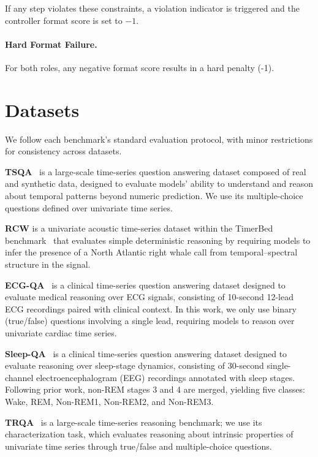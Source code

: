 If any step violates these constraints, a violation indicator
is triggered and the controller format score
is set to \(-1\).

\paragraph{Hard Format Failure.}
For both roles, any negative format score results in a hard penalty (-1).

\section{Datasets}
\label{app:datasets}



We follow each benchmark’s standard evaluation protocol, with minor restrictions for consistency across datasets.

\textbf{TSQA}~\cite{tsqa_dataset} is a large-scale time-series question answering dataset composed of real and synthetic data, designed to evaluate models’ ability to understand and reason about temporal patterns beyond numeric prediction. We use its multiple-choice questions defined over univariate time series.

\textbf{RCW} is a univariate acoustic time-series dataset within the TimerBed benchmark~\cite{rcw_dataset} that evaluates simple deterministic reasoning by requiring models to infer the presence of a North Atlantic right whale call from temporal–spectral structure in the signal.

\textbf{ECG-QA}~\cite{ecgqa_dataset} is a clinical time-series question answering dataset designed to evaluate medical reasoning over ECG signals, consisting of 10-second 12-lead ECG recordings paired with clinical context. In this work, we only use binary (true/false) questions involving a single lead, requiring models to reason over univariate cardiac time series.

\textbf{Sleep-QA}~\cite{langer2025opentslm} is a clinical time-series question answering dataset designed to evaluate reasoning over sleep-stage dynamics, consisting of 30-second single-channel electroencephalogram (EEG) recordings annotated with sleep stages. Following prior work\cite{pouliou2025new,langer2025opentslm}, non-REM stages 3 and 4 are merged, yielding five classes: Wake, REM, Non-REM1, Non-REM2, and Non-REM3.

\textbf{TRQA}~\cite{trqa_dataset} is a large-scale time-series reasoning benchmark; we use its characterization task, which evaluates reasoning about intrinsic properties of univariate time series through true/false and multiple-choice questions.


